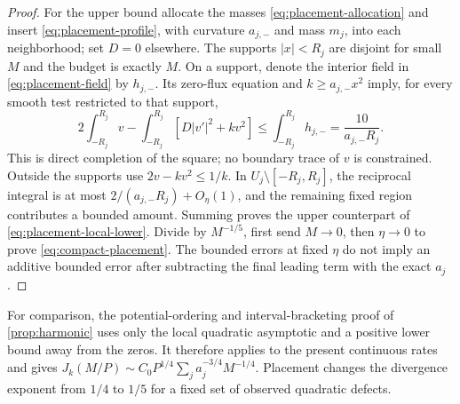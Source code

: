 \begin{proof}
For the upper bound allocate the masses \eqref{eq:placement-allocation}
and insert \eqref{eq:placement-profile}, with curvature $a_{j,-}$
and mass $m_j$, into each neighborhood; set $D=0$ elsewhere.
The supports $|x|<R_j$ are disjoint for small $M$ and the budget
is exactly $M$. On a support, denote the interior field in
\eqref{eq:placement-field} by $h_{j,-}$. Its zero-flux equation and
$k\ge a_{j,-}x^2$ imply, for every smooth test restricted to that support,
\begin{equation}\label{eq:placement-support-upper}
 2\int_{-R_j}^{R_j}v-
 \int_{-R_j}^{R_j}[D|v'|^2+kv^2]
 \le\int_{-R_j}^{R_j}h_{j,-}=\frac{10}{a_{j,-}R_j}.
\end{equation}
This is direct completion of the square; no boundary trace of $v$
is constrained. Outside the supports use $2v-kv^2\le1/k$.
In $U_j\setminus[-R_j,R_j]$, the reciprocal integral is at most
$2/(a_{j,-}R_j)+O_\eta(1)$, and the remaining fixed region contributes
a bounded amount. Summing proves the upper counterpart of
\eqref{eq:placement-local-lower}. Divide by $M^{-1/5}$, first send
$M\to0$, then $\eta\to0$ to prove \eqref{eq:compact-placement}.
The bounded errors at fixed $\eta$ do not imply an additive bounded
error after subtracting the final leading term with the exact $a_j$.
\end{proof}

For comparison, the potential-ordering and interval-bracketing proof
of \cref{prop:harmonic} uses only the local quadratic asymptotic and
a positive lower bound away from the zeros. It therefore applies to
the present continuous rates and gives
$J_k(M/P)\sim C_0P^{1/4}\sum_ja_j^{-3/4}M^{-1/4}$.
Placement changes the divergence exponent from $1/4$ to $1/5$ for a
fixed set of observed quadratic defects.

